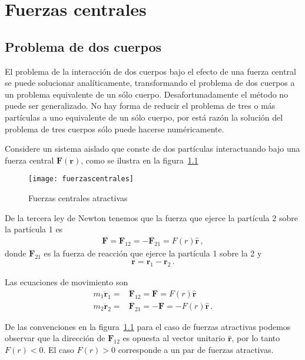 
\chapter{Fuerzas centrales}

\section{Problema de dos cuerpos}
El problema de la interacción de dos cuerpos bajo el efecto de una fuerza central se puede solucionar analíticamente, transformando el problema de dos cuerpos a un problema equivalente de un sólo cuerpo. Desafortunadamente el método no puede ser generalizado. No hay forma de reducir el problema de tres o más partículas a uno equivalente de un sólo cuerpo, por está razón la solución del problema de tres cuerpos sólo puede hacerse numéricamente. 

Considere un sistema aislado que conste de dos partículas interactuando bajo una fuerza central $\mathbf{F}(\mathbf{r})$, como se ilustra en la figura~\ref{fig:fuerzascentrales}
\begin{figure}
  \centering
  \texttt{[image: fuerzascentrales]}
  \caption{Fuerzas centrales atractivas}
  \label{fig:fuerzascentrales}
\end{figure}

De la tercera ley de Newton tenemos que la fuerza que ejerce la partícula 2 sobre la partícula 1 es
\begin{align}
  \mathbf{F}=\mathbf{F}_{12}=-\mathbf{F}_{21}=F(r)\hat{\mathbf{r}}\,,
\end{align}
donde $\mathbf{F}_{21}$ es la fuerza de reacción que ejerce la partícula 1 sobre la 2 y
\begin{align}
  \label{eq:rcentral}
  \mathbf{r}=\mathbf{r}_1-\mathbf{r}_2\,.
\end{align}

Las ecuaciones de movimiento son
\begin{align}
  \label{eq:edmfc}
  m_1\ddot{\mathbf{r}}_1=&\mathbf{F}_{12}=\mathbf{F}=F(r)\hat{\mathbf{r}}\nonumber\\
  m_2\ddot{\mathbf{r}}_2=&\mathbf{F}_{21}=-\mathbf{F}=-F(r)\hat{\mathbf{r}}\,.
\end{align}

De las convenciones en la figura~\ref{fig:fuerzascentrales} para el caso de fuerzas atractivas podemos observar que la dirección de $\mathbf{F}_{12}$ es opuesta al vector unitario $\hat{\mathbf{r}}$, por lo tanto $F(r)<0$. El caso $F(r)>0$ corresponde a un par de fuerzas atractivas. 

